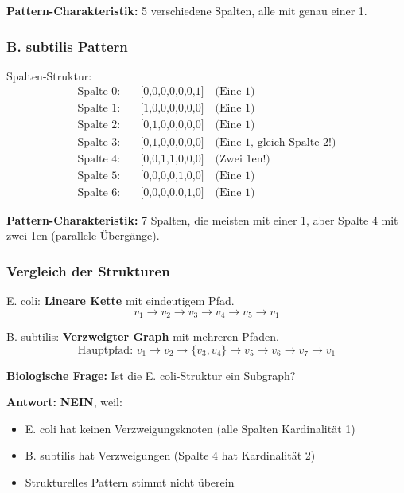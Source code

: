 \documentclass[a4paper,12pt]{article}
\theoremstyle{definition}
\begin{document}
\textbf{Pattern-Charakteristik:} 5 verschiedene Spalten, alle mit genau einer 1.

\subsubsection*{B. subtilis Pattern}

Spalten-Struktur:
\begin{align*}
\text{Spalte 0:} &\quad \text{[0,0,0,0,0,0,1]} \quad \text{(Eine 1)} \\
\text{Spalte 1:} &\quad \text{[1,0,0,0,0,0,0]} \quad \text{(Eine 1)} \\
\text{Spalte 2:} &\quad \text{[0,1,0,0,0,0,0]} \quad \text{(Eine 1)} \\
\text{Spalte 3:} &\quad \text{[0,1,0,0,0,0,0]} \quad \text{(Eine 1, gleich Spalte 2!)} \\
\text{Spalte 4:} &\quad \text{[0,0,1,1,0,0,0]} \quad \text{(Zwei 1en!)} \\
\text{Spalte 5:} &\quad \text{[0,0,0,0,1,0,0]} \quad \text{(Eine 1)} \\
\text{Spalte 6:} &\quad \text{[0,0,0,0,0,1,0]} \quad \text{(Eine 1)}
\end{align*}

\textbf{Pattern-Charakteristik:} 7 Spalten, die meisten mit einer 1, aber Spalte 4 mit zwei 1en (parallele Übergänge).

\subsubsection*{Vergleich der Strukturen}

E. coli: \textbf{Lineare Kette} mit eindeutigem Pfad.
\[
v_1 \to v_2 \to v_3 \to v_4 \to v_5 \to v_1
\]

B. subtilis: \textbf{Verzweigter Graph} mit mehreren Pfaden.
\[
\text{Hauptpfad: } v_1 \to v_2 \to \{v_3, v_4\} \to v_5 \to v_6 \to v_7 \to v_1
\]

\textbf{Biologische Frage:} Ist die E. coli-Struktur ein Subgraph?

\textbf{Antwort:} \textbf{NEIN}, weil:
\begin{itemize}
    \item E. coli hat keinen Verzweigungsknoten (alle Spalten Kardinalität 1)
    \item B. subtilis hat Verzweigungen (Spalte 4 hat Kardinalität 2)
    \item Strukturelles Pattern stimmt nicht überein
\end{itemize}
\end{document}
